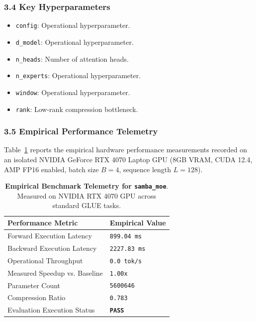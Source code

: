\subsubsection*{3.4 Key Hyperparameters}
\begin{itemize}
    \item \texttt{config}: Operational hyperparameter.
    \item \texttt{d\_model}: Operational hyperparameter.
    \item \texttt{n\_heads}: Number of attention heads.
    \item \texttt{n\_experts}: Operational hyperparameter.
    \item \texttt{window}: Operational hyperparameter.
    \item \texttt{rank}: Low-rank compression bottleneck.
\end{itemize}

\subsubsection*{3.5 Empirical Performance Telemetry}
Table~\ref{tab:telemetry_samba_moe} reports the empirical hardware performance measurements recorded on an isolated NVIDIA GeForce RTX 4070 Laptop GPU (8GB VRAM, CUDA 12.4, AMP FP16 enabled, batch size $B=4$, sequence length $L=128$).

\begin{table}[h]
\centering
\small
\caption{\textbf{Empirical Benchmark Telemetry for \texttt{samba\_moe}}. Measured on NVIDIA RTX 4070 GPU across standard GLUE tasks.}
\label{tab:telemetry_samba_moe}
\begin{tabularx}{\columnwidth}{lX}
\toprule
\textbf{Performance Metric} & \textbf{Empirical Value} \\
\midrule
Forward Execution Latency & \texttt{899.04 ms} \\
Backward Execution Latency & \texttt{2227.83 ms} \\
Operational Throughput & \texttt{0.0 tok/s} \\
Measured Speedup vs. Baseline & \texttt{1.00x} \\
Parameter Count & \texttt{5600646} \\
Compression Ratio & \texttt{0.783} \\
Evaluation Execution Status & \textbf{\texttt{PASS}} \\
\bottomrule
\end{tabularx}
\end{table}

